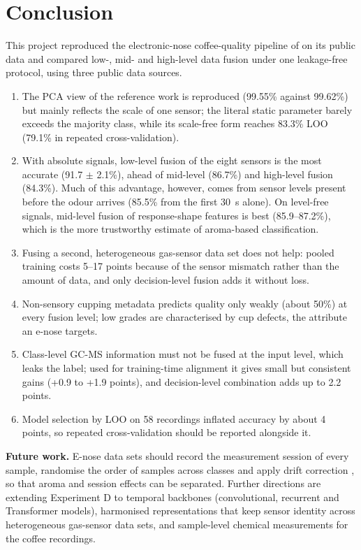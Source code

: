 \documentclass[12pt]{article}
\begin{document}
\section{Conclusion}
\label{sec:conclusion}

This project reproduced the electronic-nose coffee-quality pipeline of \cite{rodriguez2010electronic} on its public data and compared low-, mid- and high-level data fusion under one leakage-free protocol, using three public data sources.
\begin{enumerate}
\item The PCA view of the reference work is reproduced (99.55\% against 99.62\%) but mainly reflects the scale of one sensor; the literal static parameter barely exceeds the majority class, while its scale-free form reaches 83.3\% LOO (79.1\% in repeated cross-validation).
\item With absolute signals, low-level fusion of the eight sensors is the most accurate (91.7 $\pm$ 2.1\%), ahead of mid-level (86.7\%) and high-level fusion (84.3\%). Much of this advantage, however, comes from sensor levels present before the odour arrives (85.5\% from the first 30~s alone). On level-free signals, mid-level fusion of response-shape features is best (85.9--87.2\%), which is the more trustworthy estimate of aroma-based classification.
\item Fusing a second, heterogeneous gas-sensor data set does not help: pooled training costs 5--17 points because of the sensor mismatch rather than the amount of data, and only decision-level fusion adds it without loss.
\item Non-sensory cupping metadata predicts quality only weakly (about 50\%) at every fusion level; low grades are characterised by cup defects, the attribute an e-nose targets.
\item Class-level GC-MS information must not be fused at the input level, which leaks the label; used for training-time alignment it gives small but consistent gains (+0.9 to +1.9 points), and decision-level combination adds up to 2.2 points.
\item Model selection by LOO on 58 recordings inflated accuracy by about 4 points, so repeated cross-validation should be reported alongside it.
\end{enumerate}

\textbf{Future work.} E-nose data sets should record the measurement session of every sample, randomise the order of samples across classes and apply drift correction \cite{vergara2012chemical}, so that aroma and session effects can be separated. Further directions are extending Experiment D to temporal backbones (convolutional, recurrent and Transformer models), harmonised representations that keep sensor identity across heterogeneous gas-sensor data sets, and sample-level chemical measurements for the coffee recordings.
\clearpage
\end{document}
